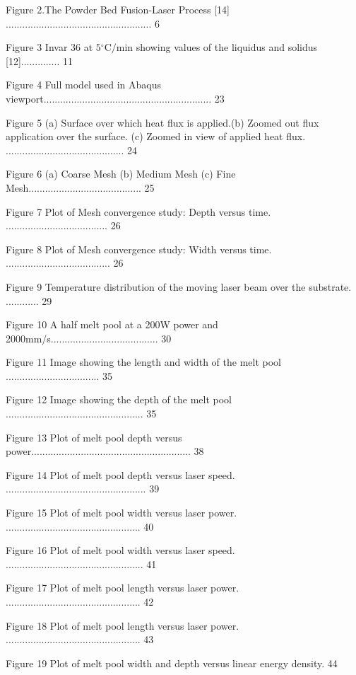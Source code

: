 \documentclass[10pt]{article}
\begin{document}
Figure 2.The Powder Bed Fusion-Laser Process [14] ..................................................... 6

Figure 3 Invar 36 at $5{ }^{\circ} \mathrm{C} / \mathrm{min}$ showing values of the liquidus and solidus [12].............. 11

Figure 4 Full model used in Abaqus viewport............................................................. 23

Figure 5 (a) Surface over which heat flux is applied.(b) Zoomed out flux application over the surface. (c) Zoomed in view of applied heat flux. ........................................... 24

Figure 6 (a) Coarse Mesh (b) Medium Mesh (c) Fine Mesh......................................... 25

Figure 7 Plot of Mesh convergence study: Depth versus time. ..................................... 26

Figure 8 Plot of Mesh convergence study: Width versus time. ...................................... 26

Figure 9 Temperature distribution of the moving laser beam over the substrate. ............ 29

Figure 10 A half melt pool at a 200W power and 2000mm/s....................................... 30

Figure 11 Image showing the length and width of the melt pool .................................. 35

Figure 12 Image showing the depth of the melt pool .................................................. 35

Figure 13 Plot of melt pool depth versus power.......................................................... 38

Figure 14 Plot of melt pool depth versus laser speed. ................................................... 39

Figure 15 Plot of melt pool width versus laser power. ................................................. 40

Figure 16 Plot of melt pool width versus laser speed. .................................................. 41

Figure 17 Plot of melt pool length versus laser power. ................................................. 42

Figure 18 Plot of melt pool length versus laser power. ................................................. 43

Figure 19 Plot of melt pool width and depth versus linear energy density. 44
\end{document}
